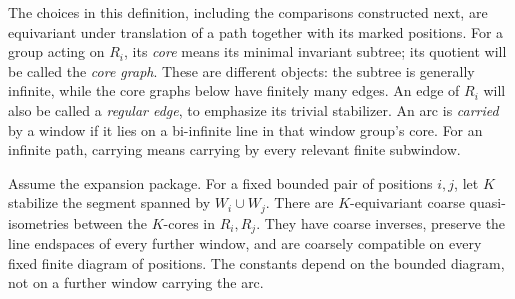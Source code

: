 The choices in this definition, including the comparisons constructed next,
are equivariant under translation of a path together with its marked
positions.  For a group acting on $R_i$, its \emph{core} means its minimal
invariant subtree; its quotient will be called the \emph{core graph}.
These are different objects: the subtree is generally infinite, while
the core graphs below have finitely many edges. An edge of \(R_i\)
will also be called a \emph{regular edge}, to emphasize its trivial
stabilizer. An arc is \emph{carried} by a window if it lies on a
bi-infinite line in that window group's core.  For an infinite path, carrying
means carrying by every relevant finite subwindow.

\begin{lemma}\label{gate:comparisons}
Assume the expansion package.  For a fixed bounded pair of positions $i,j$,
let $K$ stabilize the segment spanned by $W_i\cup W_j$.  There are
$K$-equivariant coarse quasi-isometries between the $K$-cores in $R_i,R_j$.
They have coarse inverses, preserve the line endspaces of every further
window, and are coarsely compatible on every fixed finite diagram of
positions.  The constants depend on the bounded diagram, not on a further
window carrying the arc.
\end{lemma}
